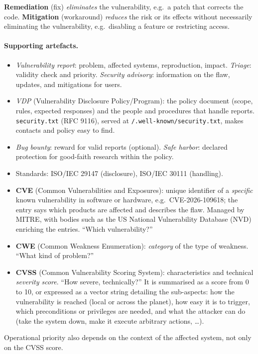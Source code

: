 \begin{definition}
\textbf{Remediation} (fix) \emph{eliminates} the vulnerability, e.g.\ a patch that corrects the code. \textbf{Mitigation} (workaround) \emph{reduces} the risk or its effects without necessarily eliminating the vulnerability, e.g.\ disabling a feature or restricting access.
\end{definition}

\paragraph{Supporting artefacts.}
\begin{itemize}
    \item \emph{Vulnerability report}: problem, affected systems, reproduction, impact. \emph{Triage}: validity check and priority. \emph{Security advisory}: information on the flaw, updates, and mitigations for users.
    \item \emph{VDP} (Vulnerability Disclosure Policy/Program): the policy document (scope, rules, expected responses) and the people and procedures that handle reports. \texttt{security.txt} (RFC 9116), served at \texttt{/.well-known/security.txt}, makes contacts and policy easy to find.
    \item \emph{Bug bounty}: reward for valid reports (optional). \emph{Safe harbor}: declared protection for good-faith research within the policy.
    \item Standards: ISO/IEC 29147 (disclosure), ISO/IEC 30111 (handling).
\end{itemize}

\begin{definition}
\leavevmode
\begin{itemize}
    \item \textbf{CVE} (Common Vulnerabilities and Exposures): unique identifier of a \emph{specific} known vulnerability in software or hardware, e.g.\ CVE-2026-109618; the entry says which products are affected and describes the flaw. Managed by MITRE, with bodies such as the US National Vulnerability Database (NVD) enriching the entries. \enquote{Which vulnerability?}
    \item \textbf{CWE} (Common Weakness Enumeration): \emph{category} of the type of weakness. \enquote{What kind of problem?}
    \item \textbf{CVSS} (Common Vulnerability Scoring System): characteristics and technical \emph{severity score}. \enquote{How severe, technically?} It is summarised as a score from 0 to 10, or expressed as a vector string detailing the sub-aspects: how the vulnerability is reached (local or across the planet), how easy it is to trigger, which preconditions or privileges are needed, and what the attacker can do (take the system down, make it execute arbitrary actions, \dots).
\end{itemize}
Operational priority also depends on the context of the affected system, not only on the CVSS score.
\end{definition}

